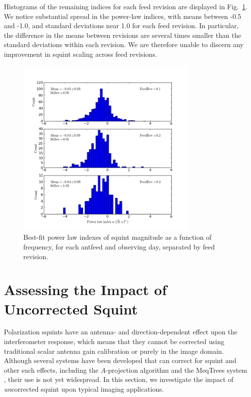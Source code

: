 \documentclass[preprint]{aastex}
\begin{document}
Histograms of the remaining indices for each feed revision are displayed in 
Fig.~\ref{fig.powerlaws}.  We notice substantial spread in the power-law 
indices, with means between -0.5 and -1.0, and standard deviations near 
1.0 for each feed revision.  In particular, the difference in the means 
between revisions are several times smaller than the standard deviations 
within each revision. We are therefore unable to discern any improvement in 
squint scaling across feed revisions.

\begin{figure}[htb]
\begin{center}
\includegraphics[width=0.8\textwidth]{images/powerlaw_rev}
\caption{Best-fit power law indexes of squint magnitude as a function
  of frequency, for each antfeed and observing day, separated by feed
  revision. \label{fig.powerlaws}}
\end{center}
\end{figure}

\section{Assessing the Impact of Uncorrected Squint}\label{s.impact}

Polarization squints have an antenna- and direction-dependent effect
upon the interferometer response, which means that they cannot be
corrected using traditional scalar antenna gain calibration or purely
in the image domain. Although several systems have been developed that
can correct for squint and other such effects, including the
$A$-projection algorithm \citep{bcgu08} and the MeqTrees system
\citep{ns10}, their use is not yet widespread. In this section, we
investigate the impact of \textit{un}corrected squint upon typical
imaging applications.
\end{document}
